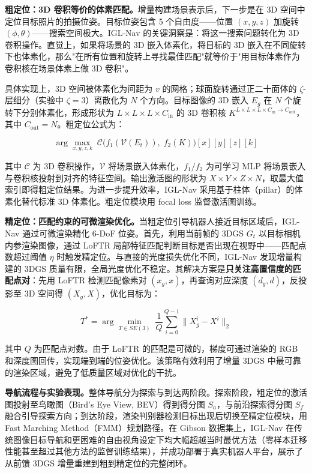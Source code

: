 \textbf{粗定位：3D 卷积等价的体素匹配。}增量构建场景表示后，下一步是在 3D 空间中定位目标照片的拍摄位姿。目标位姿包含 5 个自由度——位置 $(x, y, z)$ 加旋转 $(\phi, \theta)$——搜索空间极大。IGL-Nav 的关键洞察是：将这一搜索问题转化为 3D 卷积操作。直觉上，如果将场景的 3D 嵌入体素化，将目标的 3D 嵌入在不同旋转下也体素化，那么"在所有位置和旋转上寻找最佳匹配"就等价于"用目标体素作为卷积核在场景体素上做 3D 卷积"。

具体实现上，3D 空间被体素化为间距为 $v$ 的网格；球面旋转通过正二十面体的 $\zeta$-层细分（实验中 $\zeta = 3$）离散化为 $N$ 个方向。目标图像的 3D 嵌入 $E_g$ 在 $N$ 个旋转下分别体素化，形成形状为 $L \times L \times L \times C_{\text{in}}$ 的 3D 卷积核 $K^{L \times L \times L \times C_{\text{in}} \to C_{\text{out}}}$，其中 $C_{\text{out}} = N$。粗定位公式为：

\begin{equation}
\arg\max_{x,y,z,k}\; \mathcal{C}\bigl(f_1(\mathcal{V}(E_t)),\; f_2(K)\bigr)[x][y][z][k]
\end{equation}

其中 $\mathcal{C}$ 为 3D 卷积操作，$\mathcal{V}$ 将场景嵌入体素化，$f_1 / f_2$ 为可学习 MLP 将场景嵌入与卷积核投射到对齐的特征空间。输出激活图的形状为 $X \times Y \times Z \times N$，取最大值索引即得粗定位结果。为进一步提升效率，IGL-Nav 采用基于柱体（pillar）的体素化替代标准 3D 体素化。粗定位模块用 focal loss 监督激活图训练。

\textbf{精定位：匹配约束的可微渲染优化。}当粗定位引导机器人接近目标区域后，IGL-Nav 通过可微渲染精化 6-DoF 位姿。首先，利用当前帧的 3DGS $G_t$ 以目标相机内参渲染图像，通过 LoFTR 局部特征匹配判断目标是否出现在视野中——匹配点数超过阈值 $\eta$ 时触发精定位。与直接的光度损失优化不同，IGL-Nav 发现增量构建的 3DGS 质量有限，全局光度优化不稳定。其解决方案是\textbf{只关注高置信度的匹配点对}：先用 LoFTR 检测匹配像素对 $(x_g, x)$，再查询对应深度 $(d_g, d)$，反投影至 3D 空间得 $(X_g, X)$，优化目标为：

\begin{equation}
T^* = \arg\min_{T \in SE(3)}\; \frac{1}{Q}\sum_{i=0}^{Q-1} \| X_g^i - X^i \|_2
\end{equation}

其中 $Q$ 为匹配点对数。由于 LoFTR 的匹配是可微的，梯度可通过渲染的 RGB 和深度图回传，实现端到端的位姿优化。该策略有效利用了增量 3DGS 中最可靠的渲染区域，避免了低质量区域对优化的干扰。

\textbf{导航流程与实验表现。}整体导航分为探索与到达两阶段。探索阶段，粗定位的激活图投射至鸟瞰图（Bird's Eye View, BEV）得到得分图 $S_a$，与前沿探索得分图 $S_f$ 融合引导探索方向；到达阶段，渲染判别器检测目标出现后切换至精定位模块，用 Fast Marching Method（FMM）规划路径。在 Gibson 数据集上，IGL-Nav 在传统图像目标导航和更困难的自由视角设定下均大幅超越当时最优方法（零样本迁移性能甚至超过其他方法的监督训练结果），并成功部署于真实机器人平台，展示了从前馈 3DGS 增量重建到粗到精定位的完整闭环。

